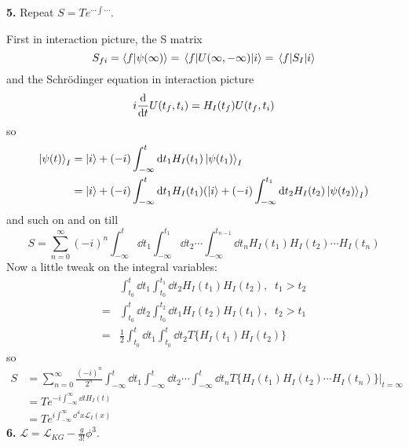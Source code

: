 \documentclass{article}
\newcommand{\lag}{\mathcal{L}}
\begin{document}
{\bf5.}\quad
Repeat $S=Te^{\cdots\int\cdots}$.

First in interaction picture, the S matrix
$$S_{fi}=\braket{f}{\psi(\infty)}=\mel{f}{U(\infty,-\infty)}{i}=\mel{f}{S_I}{i}$$
and the Schr\"odinger equation in interaction picture
$$i\dv{t}U(t_f,t_i)=H_I(t_f)U(t_f,t_i)$$
so
\begin{align*}
  \ket{\psi(t)}_I&=\ket{i}+(-i)\int_{-\infty}^{t}\dd t_1H_I(t_1)\ket{\psi(t_1)}_I\\
  &=\ket{i}+(-i)\int_{-\infty}^{t}\dd t_1H_I(t_1)(\ket{i}+(-i)\int_{-\infty}^{t_1}\dd t_2H_I(t_2)\ket{\psi(t_2)}_I)
\end{align*}
and such on and on till
$$S=\sum_{n=0}^{\infty}(-i)^n\int_{-\infty}^{t}\dd t_1\int_{-\infty}^{t_1}\dd t_2 \cdots\int_{-\infty}^{t_{n-1}}\dd t_n H_I(t_1)H_I(t_2)\cdots H_I(t_n) $$
Now a little tweak on the integral variables:
\begin{align*}
  &\int_{t_0}^{t}\dd t_1\int_{t_0}^{t_1}\dd t_2  H_I(t_1)H_I(t_2),\;\;t_1>t_2\\
  =&\int_{t_0}^{t}\dd t_2\int_{t_0}^{t_2}\dd t_1  H_I(t_2)H_I(t_1),\;\;t_2>t_1\\
  =&\frac{1}{2}\int_{t_0}^{t}\dd t_1\int_{t_0}^{t}\dd t_2  T\{H_I(t_1)H_I(t_2)\}
\end{align*}
so
\begin{align*}
  S&=\sum_{n=0}^{\infty}\frac{(-i)^n}{2^n}\int_{-\infty}^{t}\dd t_1\int_{-\infty}^{t}\dd t_2 \cdots\int_{-\infty}^{t}\dd t_n T\{H_I(t_1)H_I(t_2)\cdots H_I(t_n)\}|_{t=\infty}\\
  &=Te^{-i\int_{-\infty}^{\infty}\dd tH_I(t)}\\
  &=Te^{i\int_{-\infty}^{\infty}\dd^4 x\lag_I(x)}
\end{align*}
{\bf6.}\quad
$\lag=\lag_{KG}-\frac{g}{3!}\phi^3$.
\end{document}
